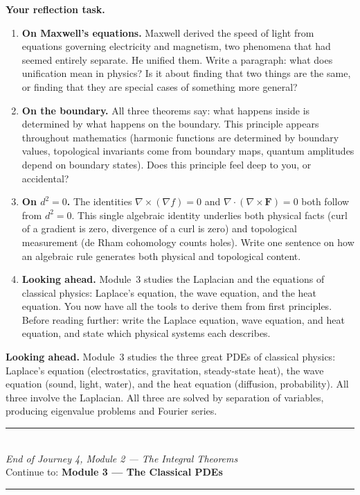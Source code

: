 \documentclass[12pt,a4paper]{article}
\newcounter{problem}
\begin{document}
\begin{reflectionbox}
\textbf{Your reflection task.}

\begin{enumerate}
  \item \textbf{On Maxwell's equations.} Maxwell derived the speed of light from equations governing electricity and magnetism, two phenomena that had seemed entirely separate. He unified them. Write a paragraph: what does unification mean in physics? Is it about finding that two things are the same, or finding that they are special cases of something more general?

  \item \textbf{On the boundary.} All three theorems say: what happens inside is determined by what happens on the boundary. This principle appears throughout mathematics (harmonic functions are determined by boundary values, topological invariants come from boundary maps, quantum amplitudes depend on boundary states). Does this principle feel deep to you, or accidental?

  \item \textbf{On $d^2=0$.} The identities $\nabla\times(\nabla f)=0$ and $\nabla\cdot(\nabla\times\mathbf{F})=0$ both follow from $d^2=0$. This single algebraic identity underlies both physical facts (curl of a gradient is zero, divergence of a curl is zero) and topological measurement (de Rham cohomology counts holes). Write one sentence on how an algebraic rule generates both physical and topological content.

  \item \textbf{Looking ahead.} Module~3 studies the Laplacian and the equations of classical physics: Laplace's equation, the wave equation, and the heat equation. You now have all the tools to derive them from first principles. Before reading further: write the Laplace equation, wave equation, and heat equation, and state which physical systems each describes.
\end{enumerate}
\end{reflectionbox}

\medskip
\noindent\textbf{Looking ahead.}
Module~3 studies the three great PDEs of classical physics: Laplace's equation (electrostatics, gravitation, steady-state heat), the wave equation (sound, light, water), and the heat equation (diffusion, probability). All three involve the Laplacian. All three are solved by separation of variables, producing eigenvalue problems and Fourier series.

\vspace{1.4cm}
\begin{center}
{\color{MidBlue}\rule{0.5\linewidth}{0.8pt}}\\[6pt]
{\small\color{DarkGrey}\textit{End of Journey 4, Module 2 --- The Integral Theorems}}\\[4pt]
{\small\color{DarkGrey}Continue to: \textbf{Module 3 --- The Classical PDEs}}\\[6pt]
{\color{MidBlue}\rule{0.5\linewidth}{0.8pt}}
\end{center}
\end{document}
